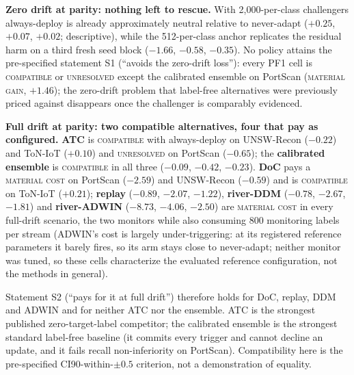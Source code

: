 \documentclass[journal]{IEEEtran}
\begin{document}


\textbf{Zero drift at parity: nothing left to rescue.} With 2{,}000-per-class challengers always-deploy is already approximately neutral relative to never-adapt ($+0.25$, $+0.07$, $+0.02$; descriptive), while the 512-per-class anchor replicates the residual harm on a third fresh seed block ($-1.66$, $-0.58$, $-0.35$). No policy attains the pre-specified statement S1 (``avoids the zero-drift loss''): every PF1 cell is \textsc{compatible} or \textsc{unresolved} except the calibrated ensemble on PortScan (\textsc{material gain}, $+1.46$); the zero-drift problem that label-free alternatives were previously priced against disappears once the challenger is comparably evidenced.

\textbf{Full drift at parity: two compatible alternatives, four that pay as configured.} \textbf{ATC} is \textsc{compatible} with always-deploy on UNSW-Recon ($-0.22$) and ToN-IoT ($+0.10$) and \textsc{unresolved} on PortScan ($-0.65$); the \textbf{calibrated ensemble} is \textsc{compatible} in all three ($-0.09$, $-0.42$, $-0.23$). \textbf{DoC} pays a \textsc{material cost} on PortScan ($-2.59$) and UNSW-Recon ($-0.59$) and is \textsc{compatible} on ToN-IoT ($+0.21$); \textbf{replay} ($-0.89$, $-2.07$, $-1.22$), \textbf{river-DDM} ($-0.78$, $-2.67$, $-1.81$) and \textbf{river-ADWIN} ($-8.73$, $-4.06$, $-2.50$) are \textsc{material cost} in every full-drift scenario, the two monitors while also consuming 800 monitoring labels per stream (ADWIN's cost is largely under-triggering: at its registered reference parameters it barely fires, so its arm stays close to never-adapt; neither monitor was tuned, so these cells characterize the evaluated reference configuration, not the methods in general).

Statement S2 (``pays for it at full drift'') therefore holds for DoC, replay, DDM and ADWIN and for neither ATC nor the ensemble. ATC is the strongest published zero-target-label competitor; the calibrated ensemble is the strongest standard label-free baseline (it commits every trigger and cannot decline an update, and it fails recall non-inferiority on PortScan). Compatibility here is the pre-specified CI90-within-$\pm0.5$ criterion, not a demonstration of equality.
\end{document}
